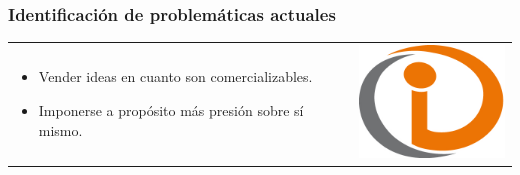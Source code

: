 \begin{frame}
\frametitle{Identificación de problemáticas actuales}
\begin{table}
\begin{tabular}{p{7cm}p{3cm}}
\begin{itemize}
    \item Vender ideas en cuanto son comercializables.
    \item Imponerse a propósito más presión sobre sí mismo.
\end{itemize}
&
\vspace{1.5cm}
\includegraphics[width=4cm]{img/example}\\
\end{tabular}
\end{table}
\end{frame}
